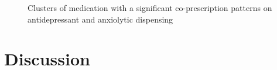 \documentclass[
  authoryear,
  review]{elsarticle}
\begin{document}
\begin{figure}


\caption{\label{fig-hi-eigen}Clusters of medication with a significant
co-prescription patterns on antidepressant and anxiolytic dispensing}

\end{figure}%

\section{Discussion}\label{discussion}
\end{document}
